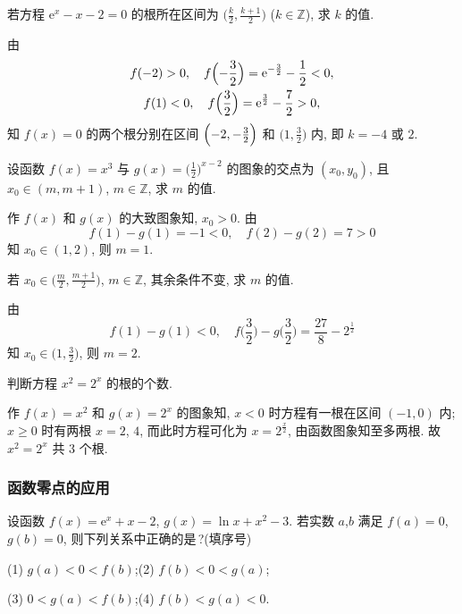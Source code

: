     \varexercise 若方程 $\mathrm{e}^x -x-2=0$ 的根所在区间为 $\Big(\frac{k}2,\frac{k+1}2\Big)$ ($k\in \mathbb{Z}$), 求 $k$ 的值.
    
    由
    \begin{gather*}
      f(-2)>0,\quad f\Bigl(-\frac32\Bigr)=\mathrm{e}^{-\frac32}-\frac12<0,\\
      f(1)<0,\quad f\Big(\frac32\Big)=\mathrm{e}^{\frac32}-\frac72>0,
    \end{gather*}
    知 $f(x)=0$ 的两个根分别在区间 $\Bigl(-2,-\frac32\Bigr)$ 和 $\Big(1,\frac32\Big)$ 内, 即 $k=-4$ 或 $2$.
  \endsolution
  
  \lianxi
  \begin{exercise}
    设函数 $f(x)=x^3$ 与 $g(x)=\Big(\frac12\Big)^{x-2}$ 的图象的交点为
    $(x_0,y_0)$, 且 $x_0 \in (m,m+1)$, $m\in \mathbb{Z}$, 
    求 $m$ 的值.
  \end{exercise}

  \beginsolution
    作 $f(x)$ 和 $g(x)$ 的大致图象知, $x_0>0$. 由
    \[f(1)-g(1)=-1<0,\quad f(2)-g(2)=7>0\]
    知 $x_0\in(1,2)$, 则 $m=1$.
    
    \varexercise 若 $x_0\in\Big(\frac{m}2,\frac{m+1}2\Big)$, $m\in\mathbb{Z}$, 其余条件不变, 求 $m$ 的值.
    
    由
    \[f(1)-g(1)<0,\quad 
      f\Big(\frac32\Big)- g\Big(\frac32\Big)= \frac{27}8-2^{\frac12}\]
    知 $x_0\in\Big(1,\frac32\Big)$, 则 $m=2$.
  \endsolution
  
  \begin{exercise}
    判断方程 $x^2=2^x$ 的根的个数.
  \end{exercise}

  \beginsolution
    作 $f(x)=x^2$ 和 $g(x)=2^x$ 的图象知, 
    $x<0$ 时方程有一根在区间 $(-1,0)$ 内; $x\geqslant0$ 时有两根 $x=2$, $4$, 而此时方程可化为 $x=2^{\frac{x}2}$, 由函数图象知至多两根. 故 $x^2=2^x$ 共 $3$ 个根.
  \endsolution
  
  \subsubsection{函数零点的应用}
  \begin{example}
    设函数 $f(x)=\mathrm{e}^x +x-2$, $g(x)=\ln x+x^2-3$. 
    若实数 $a$,$b$ 满足 $f(a)=0$, $g(b)=0$, 
    则下列关系中正确的是\,?(填序号)
   
    (1) $g(a)<0<f(b)$;\qquad (2) $f(b)<0<g(a)$;
    
    (3) $0<g(a)<f(b)$;\qquad (4) $f(b)<g(a)<0$.
  \end{example}

